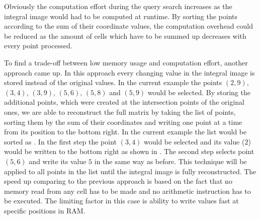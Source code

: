 Obviously the computation effort during the query search increases as the integral image would had to be computed at runtime. By sorting the points according to the sum of their coordinate values, the computation overhead could be reduced as the amount of cells which have to be summed up decreases with every point processed.

%
%

To find a trade-off between low memory usage and computation effort, another approach came up. In this approach every changing value in the integral image is stored instead of the original values. In the current example the points $(2,9)$, $(3,4)$, $(3,9)$, $(5,6)$, $(5,8)$ and $(5,9)$ would be selected. By storing the additional points, which were created at the intersection points of the original ones, we are able to reconstruct the full matrix by taking the list of points, sorting them by the sum of their coordinates and writing one point at a time from its position to the bottom right. In the current example the list would be sorted as . In the first step the point $(3,4)$ would be selected and its value ($2$) would be written to the bottom right as shown in . The second step selects point $(5,6)$ and write its value $5$ in the same way as before.
This technique will be applied to all points in the list until the integral image is fully reconstructed.
The speed up comparing to the previous approach is based on the fact that no memory read from any cell has to be made and no arithmetic instruction has to be executed. The limiting factor in this case is ability to write values fast at specific positions in \ac{RAM}.

